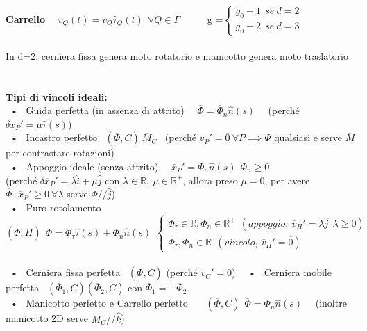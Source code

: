\documentclass{article}
\begin{document}
%
%
\textbf{Carrello} \ \ $\overline{v}_Q(t) = v_Q \hat{\tau}_Q(t) \ \ \forall Q \in \Gamma$ \ \ \ \ \  g =$\begin{cases} g_0 -1 \ \ se \ d=2 \\ g_0 -2 \ \ se \ d=3  \end{cases}$\\ \\
In d=2: cerniera fissa genera moto rotatorio e manicotto  genera moto traslatorio \linebreak \\ \\ \\
%
%
%
\textbf{Tipi di vincoli ideali:}\\
%
\ • \ Guida perfetta (in assenza di attrito) \ \ $\overline{\Phi} = \overline{\Phi}_n \hat{n}(s)$ \ \ (perché $\delta\overline{x}_P'=\mu\hat{\tau}(s)$) \\
%
\ • \ Incastro perfetto \ $(\overline{\Phi}, C) \ \overline{M}_C$ \ (perché $\overline{v}_P'=\overline{0} \ \forall P \implies \Phi$ qualsiasi e serve $\overline{M}$ per contrastare rotazioni)\\
%
\ • \ Appoggio ideale (senza attrito) \ \ $\overline{x}_P'=\Phi_n\hat{n}(s) \ \ \Phi_n\geq0$ \\ (perché $\delta \overline{x}_P'=\lambda\hat{i} + \mu \hat{j}$ con $\lambda\in\mathbb{R}, \ \mu\in\mathbb{R}^+$, allora preso $\mu =0$, per avere $\overline{\Phi}\cdot\overline{x}_P'\geq0 \ \forall \lambda$ serve $\Phi /\!\!/ \hat{j}$)\\
%
\ • \ Puro rotolamento $(\overline{\Phi},H) \ \ \overline{\Phi}=\Phi_{\tau}\hat{\tau}(s)+\Phi_n\hat{n}(s) \ \ \begin{cases}
\Phi_{\tau} \in \mathbb{R}, \Phi_n\in\mathbb{R}^+ \ \ (appoggio, \ \overline{v}_H'=\lambda\hat{j} \ \ \lambda \geq \overline{0}) \\
\Phi_{\tau}, \Phi_n \in \mathbb{R} \ \ (vincolo, \ \overline{v}_H'=\overline{0})
\end{cases}$ \\ \\
%
\ • \ Cerniera fissa perfetta \  $(\overline{\Phi},C)$ (perché $\overline{v}_C'=\overline{0}$) \ \ • \ Cerniera mobile perfetta \ $(\overline{\Phi}_1,C) (\overline{\Phi}_2,C)$ con $\overline{\Phi}_1=-\overline{\Phi}_2$ \\
%
\ • \ Manicotto perfetto e Carrello perfetto \ \ \ $(\overline{\Phi},C) \ \ \overline{\Phi}=\Phi_n\hat{n}(s)$ \ \ (inoltre manicotto 2D serve $\overline{M}_C /\!\!/ \hat{k}$) \\ \\ \\
%
%
%
%
\end{document}

